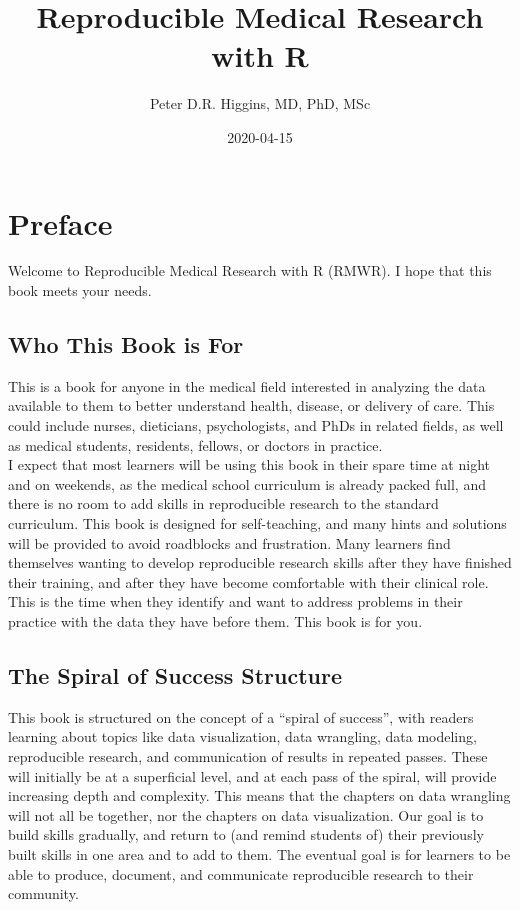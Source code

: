 \documentclass[]{book}
\title{Reproducible Medical Research with R}
\author{Peter D.R. Higgins, MD, PhD, MSc}
\date{2020-04-15}
\begin{document}
\maketitle

{
\setcounter{tocdepth}{1}
\tableofcontents
}
\hypertarget{preface}{%
\chapter{Preface}\label{preface}}

Welcome to Reproducible Medical Research with R (RMWR). I hope that this book meets your needs.

\hypertarget{who-this-book-is-for}{%
\section{Who This Book is For}\label{who-this-book-is-for}}

This is a book for anyone in the medical field interested in analyzing the data available to them to better understand health, disease, or delivery of care. This could include nurses, dieticians, psychologists, and PhDs in related fields, as well as medical students, residents, fellows, or doctors in practice.\\
I expect that most learners will be using this book in their spare time at night and on weekends, as the medical school curriculum is already packed full, and there is no room to add skills in reproducible research to the standard curriculum. This book is designed for self-teaching, and many hints and solutions will be provided to avoid roadblocks and frustration.
Many learners find themselves wanting to develop reproducible research skills after they have finished their training, and after they have become comfortable with their clinical role. This is the time when they identify and want to address problems in their practice with the data they have before them. This book is for you.

\hypertarget{the-spiral-of-success-structure}{%
\section{The Spiral of Success Structure}\label{the-spiral-of-success-structure}}

This book is structured on the concept of a ``spiral of success'', with readers learning about topics like data visualization, data wrangling, data modeling, reproducible research, and communication of results in repeated passes. These will initially be at a superficial level, and at each pass of the spiral, will provide increasing depth and complexity. This means that the chapters on data wrangling will not all be together, nor the chapters on data visualization. Our goal is to build skills gradually, and return to (and remind students of) their previously built skills in one area and to add to them. The eventual goal is for learners to be able to produce, document, and communicate reproducible research to their community.
\end{document}
